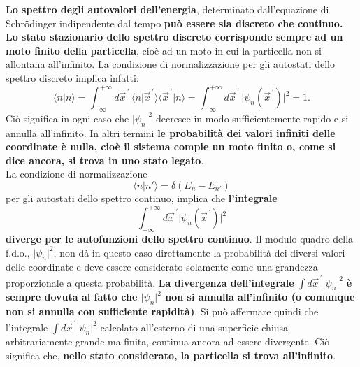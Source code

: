 \documentclass[a4paper,12pt,oneside]{book}
\begin{document}
\textbf{Lo spettro degli autovalori dell'energia}, determinato dall'equazione di Schr\"{o}dinger indipendente dal tempo \textbf{può essere sia discreto che continuo. Lo stato stazionario dello spettro discreto corrisponde sempre ad un moto finito della particella}, cioè ad un moto in cui la particella non si allontana all'infinito. La condizione di normalizzazione per gli autostati dello spettro discreto implica infatti:
	\begin{equation}
		\langle n \vert n \rangle = \int _{- \infty} ^{+\infty} d{\vec{x}}^{\, \prime}\,\langle n \vert {\vec{x}}^{\, \prime} \rangle \langle {\vec{x}}^{\, \prime} \vert n \rangle = \int _{- \infty} ^{+\infty} d{\vec{x}}^{\, \prime}\, \vert \psi _n ({\vec{x}}^{\, \prime}) \vert ^2 =1.
	\end{equation}
Ciò significa in ogni caso che $ \vert \psi _n  \vert ^2$ decresce in modo sufficientemente rapido e si annulla all'infinito. In altri termini \textbf{le probabilità dei valori infiniti delle coordinate è nulla, cioè il sistema compie un moto finito o, come si dice ancora, si trova in uno stato legato}.\\

La condizione di normalizzazione
	\begin{equation}
		\langle n \vert n' \rangle = \delta (E_n - E_{n'})
	\end{equation}
per gli autostati dello spettro continuo, implica che \textbf{l'integrale}
	\begin{equation}
		\int _{- \infty} ^{+\infty} d{\vec{x}}^{\, \prime} \vert \psi _n ({\vec{x}}^{\, \prime}) \vert ^2
	\end{equation}
\textbf{diverge per le autofunzioni dello spettro continuo}. Il modulo quadro della f.d.o., $\vert \psi _n \vert ^2 $, non dà in questo caso direttamente la probabilità dei diversi valori delle coordinate e deve essere considerato solamente come una grandezza proporzionale a questa probabilità. \textbf{La divergenza dell'integrale} $ \int  d{\vec{x}}^{\, \prime} \vert \psi _n  \vert ^2$ \textbf{è sempre dovuta al fatto che $\vert \psi _n  \vert ^2$ non si annulla all'infinito (o comunque non si annulla con sufficiente rapidità)}. Si può affermare quindi che l'integrale $ \int  d{\vec{x}}^{\, \prime} \vert \psi _n  \vert ^2$ calcolato all'esterno di una superficie chiusa arbitrariamente grande ma finita, continua ancora ad essere divergente. Ciò significa che, \textbf{nello stato considerato, la particella si trova all'infinito}.\\
\end{document}
